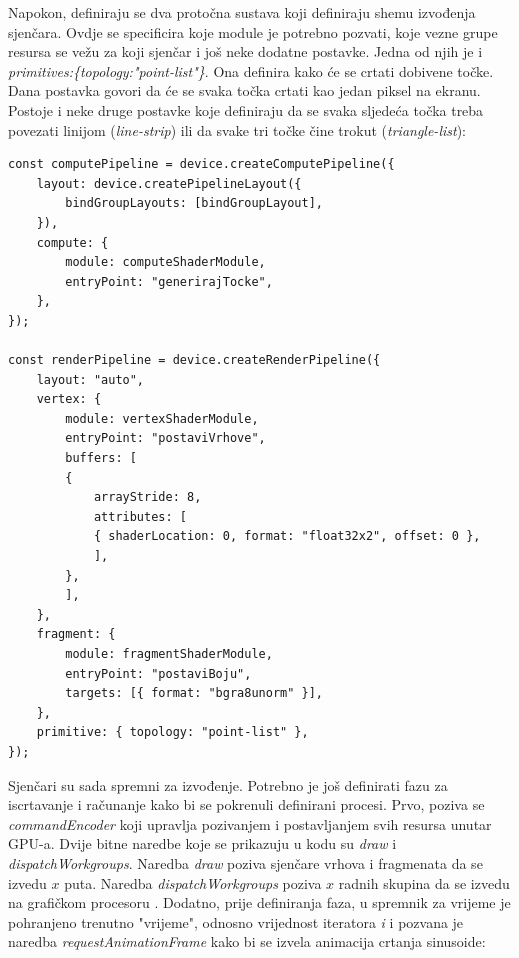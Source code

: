 \documentclass{foi}
\begin{document}
Napokon, definiraju se dva protočna sustava koji definiraju shemu izvođenja sjenčara. Ovdje se specificira koje module je potrebno pozvati, koje vezne grupe resursa se vežu za koji sjenčar i još neke dodatne postavke. Jedna od njih je i \textit{primitives:\{topology:"point-list"\}}. Ona definira kako će se crtati dobivene točke. Dana postavka govori da će se svaka točka crtati kao jedan piksel na ekranu. Postoje i neke druge postavke koje definiraju da se svaka sljedeća točka treba povezati linijom (\textit{line-strip}) ili da svake tri točke čine trokut (\textit{triangle-list}):

\begin{verbatim}
const computePipeline = device.createComputePipeline({
	layout: device.createPipelineLayout({
		bindGroupLayouts: [bindGroupLayout],
	}),
	compute: {
		module: computeShaderModule,
		entryPoint: "generirajTocke",
	},
});

const renderPipeline = device.createRenderPipeline({
	layout: "auto",
	vertex: {
		module: vertexShaderModule,
		entryPoint: "postaviVrhove",
		buffers: [
		{
			arrayStride: 8,
			attributes: [
			{ shaderLocation: 0, format: "float32x2", offset: 0 },
			],
		},
		],
	},
	fragment: {
		module: fragmentShaderModule,
		entryPoint: "postaviBoju",
		targets: [{ format: "bgra8unorm" }],
	},
	primitive: { topology: "point-list" },
});
\end{verbatim}

Sjenčari su sada spremni za izvođenje. Potrebno je još definirati fazu za iscrtavanje i računanje kako bi se pokrenuli definirani procesi. Prvo, poziva se \textit{commandEncoder} koji upravlja pozivanjem i postavljanjem svih resursa unutar GPU-a. Dvije bitne naredbe koje se prikazuju u kodu su \textit{draw} i \textit{dispatchWorkgroups}. Naredba \textit{draw} poziva sjenčare vrhova i fragmenata da se izvedu $x$ puta. Naredba \textit{dispatchWorkgroups} poziva $x$ radnih skupina da se izvedu na grafičkom procesoru \parencite{W3CWebGPU2024}. Dodatno, prije definiranja faza, u spremnik za vrijeme je pohranjeno trenutno "vrijeme", odnosno vrijednost iteratora \textit{i} i pozvana je naredba \textit{requestAnimationFrame} kako bi se izvela animacija crtanja sinusoide:
\end{document}
